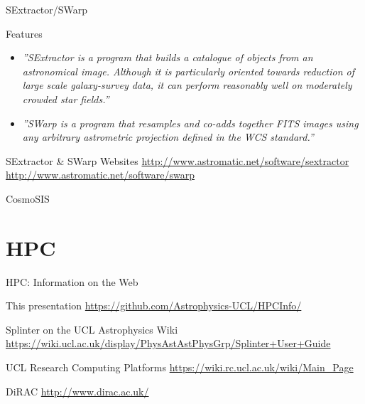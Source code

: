\documentclass{beamer}
\begin{document}
\begin{frame}{SExtractor/SWarp}
  \begin{block}{Features}
   \begin{itemize}
    \item{\textit{''SExtractor is a program that builds a catalogue of objects from an astronomical image. Although it is particularly oriented towards reduction of large scale galaxy-survey data, it can perform reasonably well on moderately crowded star fields.''}}
    \item{\textit{''SWarp is a program that resamples and co-adds together FITS images using any arbitrary astrometric projection defined in the WCS standard.''}}
   \end{itemize}
  \end{block}
  \begin{block}{SExtractor \& SWarp Websites}
    \url{http://www.astromatic.net/software/sextractor}\\
    \url{http://www.astromatic.net/software/swarp}
  \end{block}
\end{frame}

\begin{frame}{CosmoSIS}

\end{frame}

\section{HPC}

\begin{frame}{HPC: Information on the Web}
  \begin{block}{This presentation}
    \url{https://github.com/Astrophysics-UCL/HPCInfo/}
  \end{block}

    \begin{block}{Splinter on the UCL Astrophysics Wiki}
    \url{https://wiki.ucl.ac.uk/display/PhysAstAstPhysGrp/Splinter+User+Guide}
  \end{block}

  \begin{block}{UCL Research Computing Platforms}
    \url{https://wiki.rc.ucl.ac.uk/wiki/Main_Page}
  \end{block}

  \begin{block}{DiRAC}
    \url{http://www.dirac.ac.uk/}
  \end{block}

\end{frame}
\end{document}
